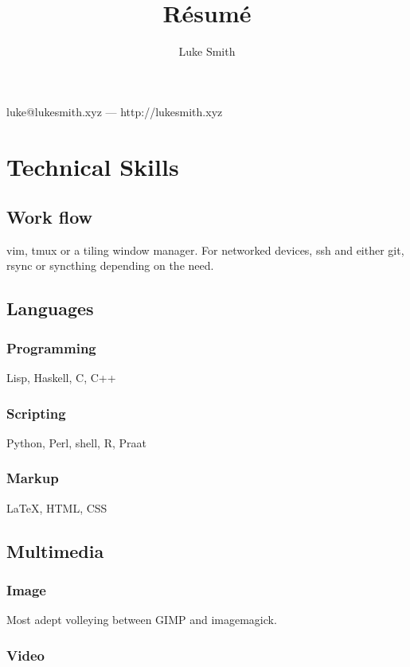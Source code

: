 \documentclass{article}
\makeatletter
\renewcommand{\maketitle}{
\begin{center}
{\huge\bfseries
\theauthor}

\vspace{.25em}

luke@lukesmith.xyz --- http://lukesmith.xyz

\end{center}
}
\makeatother
\begin{document}

\title{R\'esum\'e}
\author{Luke Smith}

\maketitle

\section{Technical Skills}

\subsection{Work flow}

vim, tmux or a tiling window manager. For networked devices, ssh and either git, rsync or syncthing depending on the need.

\subsection{Languages}

\subsubsection{Programming}

Lisp, Haskell, C, C++

\subsubsection{Scripting}

Python, Perl, shell, R, Praat

\subsubsection{Markup}
{\LaTeX}, HTML, CSS 
\subsection{Multimedia}

\subsubsection{Image}

Most adept volleying between GIMP and imagemagick.

\subsubsection{Video}
\end{document}

